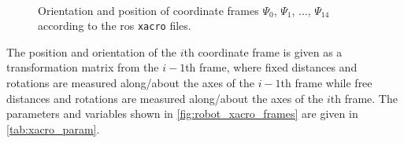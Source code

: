 \begin{figure}[htbp]
\vspace*{-10mm}
\hspace{-10mm}
%
\vspace{5mm}\\
\hspace*{-15mm}
%
\caption{Orientation and position of coordinate frames $\Psi_0$, $\Psi_1$, ..., $\Psi_{14}$ according to the \gls{ros} \texttt{xacro} files.}
\label{fig:robot_xacro_frames}
\end{figure}

The position and orientation of the $i$th coordinate frame is given as a transformation matrix from the $i-1$th frame, where fixed distances and rotations are measured along/about the axes of the $i-1$th frame while free distances and rotations are measured along/about the axes of the $i$th frame. The parameters and variables shown in \autoref{fig:robot_xacro_frames} are given in \autoref{tab:xacro_param}.

